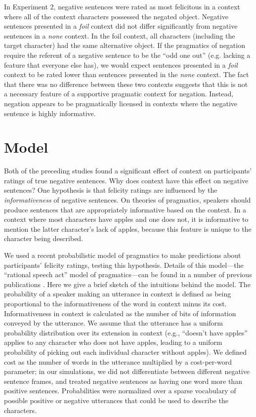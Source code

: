 \documentclass[10pt,letterpaper]{article}
\begin{document}
In Experiment 2, negative sentences were rated as most felicitous in a context where all of the context characters possessed the negated object.  Negative sentences presented in a \emph{foil} context did not differ significantly from negative sentences in a \emph{none} context.  In the foil context, all characters (including the target character) had the same alternative object.  If the pragmatics of negation require the referent of a negative sentence to be the ``odd one out'' (e.g. lacking a feature that everyone else has), we would expect sentences presented in a \emph{foil} context to be rated lower than sentences presented in the \emph{none} context.  The fact that there was no difference between these two contexts suggests that this is not a necessary feature of a supportive pragmatic context for negation.   Instead, negation appears to be pragmatically licensed in contexts where the negative sentence is highly informative.  

\section{Model}

Both of the preceding studies found a significant effect of context on participants' ratings of true negative sentences.  Why does context have this effect on negative sentences?  One hypothesis is that felicity ratings are influenced by the \emph{informativeness} of negative sentences. On theories of pragmatics, speakers should produce sentences that are appropriately informative based on the context.  In a context where most characters have apples and one does not, it is informative to mention the latter character's lack of apples, because this feature is unique to the character being described.

We used a recent probabilistic model of pragmatics to make predictions about participants' felicity ratings, testing this hypothesis. Details of this model---the ``rational speech act'' model of pragmatics---can be found in a number of previous publications \cite{frank2012,goodman2013,nordmeyer2014}. Here we give a brief sketch of the intuitions behind the model. The probability of a speaker making an utterance in context is defined as being  proportional to the informativeness of the word in context minus its cost.  Informativeness in context is calculated as the number of bits of information conveyed by the utterance.  We assume that the utterance has a uniform probability distribution over its extension in context (e.g., ``doesn't have apples'' applies to any character who does not have apples, leading to a uniform probability of picking out each individual character without apples). We defined cost as the number of words in the utterance multiplied by a cost-per-word parameter; in our simulations, we did not differentiate between different negative sentence frames, and treated negative sentences as having one word more than positive sentences.  Probabilities were normalized over a sparse vocabulary of possible positive or negative utterances that could be used to describe the characters.
\end{document}

